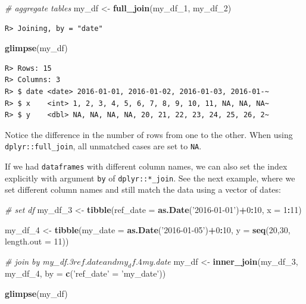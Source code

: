 \documentclass[
  12pt,
]{book}
\newenvironment{Shaded}{\begin{snugshade}}{\end{snugshade}}
\newcommand{\CommentTok}[1]{\textcolor[rgb]{0.37,0.37,0.37}{\textit{#1}}}
\newcommand{\DataTypeTok}[1]{\textcolor[rgb]{0.27,0.27,0.27}{#1}}
\newcommand{\DecValTok}[1]{\textcolor[rgb]{0.06,0.06,0.06}{#1}}
\newcommand{\KeywordTok}[1]{\textcolor[rgb]{0.27,0.27,0.27}{\textbf{#1}}}
\newcommand{\NormalTok}[1]{#1}
\newcommand{\OperatorTok}[1]{\textcolor[rgb]{0.43,0.43,0.43}{\textbf{#1}}}
\newcommand{\StringTok}[1]{\textcolor[rgb]{0.5,0.5,0.5}{#1}}
\begin{document}
\begin{Shaded}
\begin{Highlighting}[]
\CommentTok{# aggregate tables}
\NormalTok{my_df <-}\StringTok{ }\KeywordTok{full_join}\NormalTok{(my_df_}\DecValTok{1}\NormalTok{, }
\NormalTok{                   my_df_}\DecValTok{2}\NormalTok{)}
\end{Highlighting}
\end{Shaded}

\begin{verbatim}
R> Joining, by = "date"
\end{verbatim}

\begin{Shaded}
\begin{Highlighting}[]
\KeywordTok{glimpse}\NormalTok{(my_df)}
\end{Highlighting}
\end{Shaded}

\begin{verbatim}
R> Rows: 15
R> Columns: 3
R> $ date <date> 2016-01-01, 2016-01-02, 2016-01-03, 2016-01-~
R> $ x    <int> 1, 2, 3, 4, 5, 6, 7, 8, 9, 10, 11, NA, NA, NA~
R> $ y    <dbl> NA, NA, NA, NA, 20, 21, 22, 23, 24, 25, 26, 2~
\end{verbatim}

Notice the difference in the number of rows from one to the other. When using \texttt{dplyr::full\_join}, all unmatched cases are set to \texttt{NA}.

If we had \texttt{dataframes} with different column names, we can also set the index explicitly with argument \texttt{by} of \texttt{dplyr::*\_join}. See the next example, where we set different column names and still match the data using a vector of dates:

\begin{Shaded}
\begin{Highlighting}[]
\CommentTok{# set df}
\NormalTok{my_df_}\DecValTok{3}\NormalTok{ <-}\StringTok{ }\KeywordTok{tibble}\NormalTok{(}\DataTypeTok{ref_date =} \KeywordTok{as.Date}\NormalTok{(}\StringTok{'2016-01-01'}\NormalTok{)}\OperatorTok{+}\DecValTok{0}\OperatorTok{:}\DecValTok{10}\NormalTok{,}
                  \DataTypeTok{x =} \DecValTok{1}\OperatorTok{:}\DecValTok{11}\NormalTok{)}

\NormalTok{my_df_}\DecValTok{4}\NormalTok{ <-}\StringTok{ }\KeywordTok{tibble}\NormalTok{(}\DataTypeTok{my_date =} \KeywordTok{as.Date}\NormalTok{(}\StringTok{'2016-01-05'}\NormalTok{)}\OperatorTok{+}\DecValTok{0}\OperatorTok{:}\DecValTok{10}\NormalTok{,}
                  \DataTypeTok{y =} \KeywordTok{seq}\NormalTok{(}\DecValTok{20}\NormalTok{,}\DecValTok{30}\NormalTok{, }\DataTypeTok{length.out =} \DecValTok{11}\NormalTok{))}

\CommentTok{# join by my_df.3$ref.date and my_df.4$my.date}
\NormalTok{my_df <-}\StringTok{ }\KeywordTok{inner_join}\NormalTok{(my_df_}\DecValTok{3}\NormalTok{, my_df_}\DecValTok{4}\NormalTok{,}
                    \DataTypeTok{by =} \KeywordTok{c}\NormalTok{(}\StringTok{'ref_date'}\NormalTok{ =}\StringTok{ 'my_date'}\NormalTok{))}

\KeywordTok{glimpse}\NormalTok{(my_df)}
\end{Highlighting}
\end{Shaded}
\end{document}
